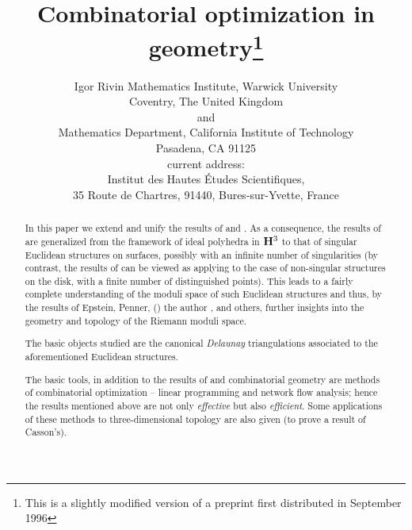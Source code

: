 \documentclass{acmart}
\begin{document}

\title{Combinatorial optimization in geometry\footnote{This is a
slightly modified version of a preprint first distributed in September
1996}}

%
\author{Igor Rivin Mathematics Institute, Warwick University\\
Coventry, The United Kingdom\\
and
\\
Mathematics Department, California Institute of   Technology
\\Pasadena, CA 91125\\
current address:\\
 Institut des Hautes \'Etudes Scientifiques, \\
35 Route de Chartres, 91440, Bures-sur-Yvette, France
}

\begin{abstract}
In this paper we extend and unify the results of \cite{steiner} and
\cite{rvol}. As a consequence, the results of \cite{steiner} are
generalized from the framework of ideal polyhedra in ${\bf H}^3$ to
that of singular Euclidean structures on surfaces, possibly with an
infinite number of singularities (by contrast, the results of
\cite{steiner} can be viewed as applying to the case of non-singular
structures on the disk, with a finite number of distinguished
points). This leads to a fairly complete 
understanding of the moduli space of such Euclidean structures and
thus, by the results of Epstein, Penner, (\cite{penner,ep,np}) the
author \cite{rvol,rivid}, and others, further
insights into the geometry and topology of the Riemann moduli space. 

The basic objects studied are the canonical \emph{Delaunay}
triangulations associated to the aforementioned Euclidean structures.

The basic tools, in addition to the results of \cite{rvol} and
combinatorial geometry are methods of combinatorial optimization --
linear programming and network flow analysis; hence the results
mentioned above are not only \emph{effective} but also
\emph{efficient}. Some applications of these
methods to three-dimensional topology are also given (to prove a
result of Casson's).
\end{abstract}
\end{document}
